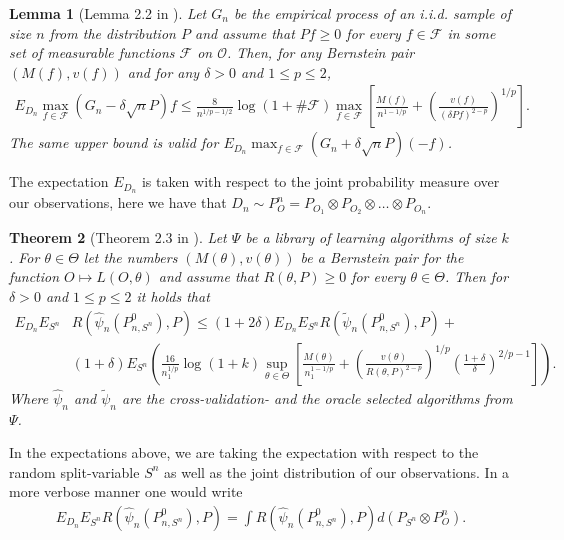 \documentclass[11pt, a4paper]{article}
\newtheorem{theorem}{Theorem}
\newtheorem{lemma}[theorem]{Lemma}
\theoremstyle{definition}
\theoremstyle{remark}
\newcommand{\ml}{k}
\newcommand{\btheta}{\theta}
\newcommand{\la}{\psi}
\newcommand{\Sn}{S^n}
\newcommand{\lib}{\Psi}
\begin{document}
\begin{lemma}[Lemma 2.2 in \parencite{vaart06}] \label{finitesamplebound}
    Let $G_{n}$ be the empirical process of an i.i.d. sample of size $n$ from the distribution $P$ and assume that $P f \geq 0$ for every $f \in \mathcal{F}$ in some set of measurable functions $ \mathcal{F} $ on $ \mathcal{O} $. Then, for any Bernstein pair $(M(f), v(f))$ and for any $\delta>0$ and $1 \leq p \leq 2$,
    \begin{align*}
        E_{D_n} \max_{f \in \mathcal{F}}(G_n-\delta \sqrt{n} P) f \leq \frac{8}{n^{1 / p-1 / 2}} \log (1+\# \mathcal{F}) \max _{f \in \mathcal{F}}\left[\frac{M(f)}{n^{1-1 / p}}+\left(\frac{v(f)}{(\delta P f)^{2-p}}\right)^{1 / p}\right].
    \end{align*}
    The same upper bound is valid for $ E_{D_n} \max_{f \in \mathcal{F}}(G_n+\delta \sqrt{n} P)(-f) $. 
\end{lemma}
The expectation $ E_{D_n} $ is taken with respect to the joint probability measure over our observations, here we have that $ D_n \sim P_{O}^{n} = P_{O_1} \otimes P_{O_2} \otimes \dots \otimes P_{O_n} $. 

\begin{theorem}[Theorem 2.3 in \parencite{vaart06}] \label{finitesample}
   Let $ \lib $ be a library of learning algorithms of size $ \ml $. For $ \btheta \in \Theta $ let the numbers $ (M(\btheta) , v(\btheta)) $ be a Bernstein pair for the function $ O \mapsto L(O, \btheta) $ and assume that $ R(\btheta, P) \geq 0 $ for every $ \btheta \in \Theta $. Then for $ \delta > 0 $ and $ 1 \leq p \leq 2 $ it holds that 
   \begin{align*}
       E_{D_n} E_{\Sn} &R(\hat{\la}_n(P_{n, \Sn}^{0}), P) \leq(1 + 2 \delta) E_{D_n} E_{\Sn} R( \tilde{\la}_n(P_{n,\Sn}^{0}), P) +\\
                       &(1 + \delta) E_{\Sn} \left(  \frac{16}{n_1^{1/p}} \log (1 +k) \sup_{\btheta \in \Theta} \left[ \frac{M(\btheta)}{n_1^{1-1/p}} +  \left( \frac{v(\btheta)}{R(\btheta, P)^{2-p}} \right)^{1/p} \left( \frac{1 + \delta}{\delta} \right)^{2/p-1} \right]\right).
   \end{align*}
   Where $ \hat{\la}_n $ and $ \tilde{\la}_n $ are the cross-validation- and the oracle selected algorithms from $ \lib $. 
\end{theorem}
In the expectations above, we are taking the expectation with respect to the random split-variable $ \Sn $ as well as the joint distribution of our observations. In a more verbose manner one would write 
\begin{align*}
    E_{D_n} E_{\Sn}  R(\hat{\la}_n(P_{n, \Sn}^{0}), P) = \int R(\hat{\la}_n(P_{n, \Sn}^{0}), P) d (P_{\Sn} \otimes  P^{n}_O ).
\end{align*}
\end{document}
